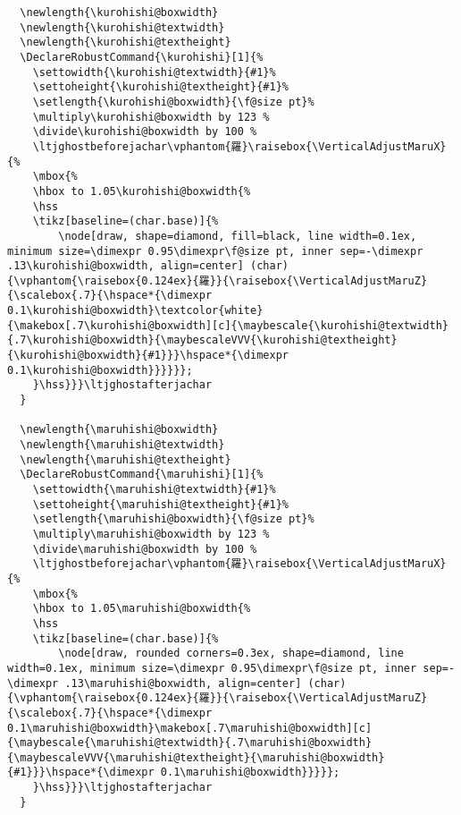 \documentclass[luatex,fontsize=10pt,paper=b5,twoside]{jlreq}%
\begin{document}
\begin{lstlisting}
  \newlength{\kurohishi@boxwidth}
  \newlength{\kurohishi@textwidth}
  \newlength{\kurohishi@textheight}
  \DeclareRobustCommand{\kurohishi}[1]{%
    \settowidth{\kurohishi@textwidth}{#1}%
    \settoheight{\kurohishi@textheight}{#1}%
    \setlength{\kurohishi@boxwidth}{\f@size pt}%
    \multiply\kurohishi@boxwidth by 123 %
    \divide\kurohishi@boxwidth by 100 %
    \ltjghostbeforejachar\vphantom{羅}\raisebox{\VerticalAdjustMaruX}{%
    \mbox{%
    \hbox to 1.05\kurohishi@boxwidth{%
    \hss
    \tikz[baseline=(char.base)]{%
        \node[draw, shape=diamond, fill=black, line width=0.1ex, minimum size=\dimexpr 0.95\dimexpr\f@size pt, inner sep=-\dimexpr .13\kurohishi@boxwidth, align=center] (char) {\vphantom{\raisebox{0.124ex}{羅}}{\raisebox{\VerticalAdjustMaruZ}{\scalebox{.7}{\hspace*{\dimexpr 0.1\kurohishi@boxwidth}\textcolor{white}{\makebox[.7\kurohishi@boxwidth][c]{\maybescale{\kurohishi@textwidth}{.7\kurohishi@boxwidth}{\maybescaleVVV{\kurohishi@textheight}{\kurohishi@boxwidth}{#1}}}\hspace*{\dimexpr 0.1\kurohishi@boxwidth}}}}}};
    }\hss}}}\ltjghostafterjachar
  }

  \newlength{\maruhishi@boxwidth}
  \newlength{\maruhishi@textwidth}
  \newlength{\maruhishi@textheight}
  \DeclareRobustCommand{\maruhishi}[1]{%
    \settowidth{\maruhishi@textwidth}{#1}%
    \settoheight{\maruhishi@textheight}{#1}%
    \setlength{\maruhishi@boxwidth}{\f@size pt}%
    \multiply\maruhishi@boxwidth by 123 %
    \divide\maruhishi@boxwidth by 100 %
    \ltjghostbeforejachar\vphantom{羅}\raisebox{\VerticalAdjustMaruX}{%
    \mbox{%
    \hbox to 1.05\maruhishi@boxwidth{%
    \hss
    \tikz[baseline=(char.base)]{%
        \node[draw, rounded corners=0.3ex, shape=diamond, line width=0.1ex, minimum size=\dimexpr 0.95\dimexpr\f@size pt, inner sep=-\dimexpr .13\maruhishi@boxwidth, align=center] (char) {\vphantom{\raisebox{0.124ex}{羅}}{\raisebox{\VerticalAdjustMaruZ}{\scalebox{.7}{\hspace*{\dimexpr 0.1\maruhishi@boxwidth}\makebox[.7\maruhishi@boxwidth][c]{\maybescale{\maruhishi@textwidth}{.7\maruhishi@boxwidth}{\maybescaleVVV{\maruhishi@textheight}{\maruhishi@boxwidth}{#1}}}\hspace*{\dimexpr 0.1\maruhishi@boxwidth}}}}};
    }\hss}}}\ltjghostafterjachar
  }


\end{lstlisting}
\end{document}
